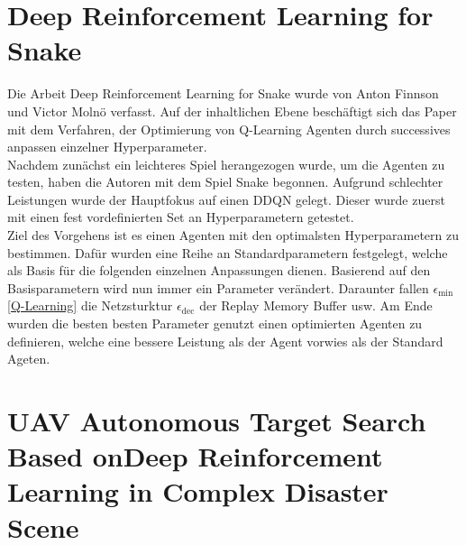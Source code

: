 \section{Deep Reinforcement Learning for Snake}
Die Arbeit Deep Reinforcement Learning for Snake wurde von Anton Finnson und Victor Molnö verfasst. Auf der inhaltlichen Ebene beschäftigt sich das Paper mit dem Verfahren, der Optimierung von Q-Learning Agenten durch successives anpassen einzelner Hyperparameter.\\
Nachdem zunächst ein leichteres Spiel herangezogen wurde, um die Agenten zu testen, haben die Autoren mit dem Spiel Snake begonnen. Aufgrund schlechter Leistungen wurde der Hauptfokus auf einen DDQN gelegt. Dieser wurde zuerst mit einen fest vordefinierten Set an Hyperparametern getestet.\\
Ziel des Vorgehens ist es einen Agenten mit den optimalsten Hyperparametern zu bestimmen. Dafür wurden eine Reihe an Standardparametern festgelegt, welche als Basis für die folgenden einzelnen Anpassungen dienen. Basierend auf den Basisparametern wird nun immer ein Parameter verändert. Daraunter fallen $\epsilon_{\text{min}}$ \ref{Q-Learning} die Netzsturktur $\epsilon_{\text{dec}}$ der Replay Memory Buffer usw. Am Ende wurden die besten besten Parameter genutzt einen optimierten Agenten zu definieren, welche eine bessere Leistung als der Agent vorwies als der Standard Ageten.

\section{UAV Autonomous Target Search Based onDeep Reinforcement Learning in Complex Disaster Scene}

